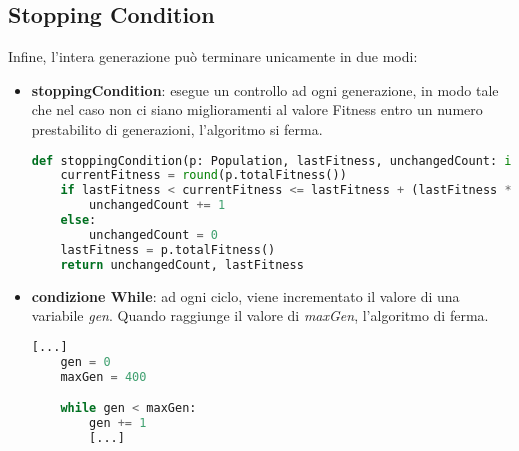 \documentclass{article}
\begin{document}
\subsection{Stopping Condition}
Infine, l'intera generazione può terminare unicamente in due modi:
\begin{itemize}
    \item \textbf{stoppingCondition}: esegue un controllo ad ogni generazione, in modo tale che nel caso non ci siano miglioramenti al valore Fitness entro un numero prestabilito di generazioni, l'algoritmo si ferma.
\begin{lstlisting}[language = Python]
def stoppingCondition(p: Population, lastFitness, unchangedCount: int, increaseRate: float) -> tuple[int, int]:
    currentFitness = round(p.totalFitness())
    if lastFitness < currentFitness <= lastFitness + (lastFitness * increaseRate):
        unchangedCount += 1
    else:
        unchangedCount = 0
    lastFitness = p.totalFitness()
    return unchangedCount, lastFitness
\end{lstlisting}
\end{itemize}
\begin{itemize}
    \item \textbf{condizione While}: ad ogni ciclo, viene incrementato il valore di una variabile \textit{gen}. Quando raggiunge il valore di \textit{maxGen}, l'algoritmo di ferma.
\begin{lstlisting}[language = Python]
    [...]
    gen = 0
    maxGen = 400

    while gen < maxGen:
        gen += 1
        [...]
\end{lstlisting}

\end{itemize}
\pagebreak
\end{document}
